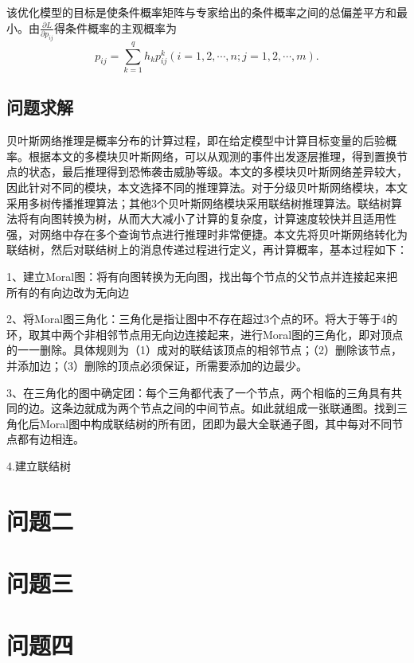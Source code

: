 \documentclass[bwprint]{gmcmthesis}
\begin{document}
该优化模型的目标是使条件概率矩阵与专家给出的条件概率之间的总偏差平方和最小。由$\frac{\partial L}{\partial p_{ij}}$得条件概率的主观概率为
\begin{equation}
	p_{ij}=\sum_{k=1}^{q}h_kp_{ij}^k(i=1,2,\cdots,n;j=1,2,\cdots,m).
\end{equation}
\subsection{问题求解}
贝叶斯网络推理是概率分布的计算过程，即在给定模型中计算目标变量的后验概率。根据本文的多模块贝叶斯网络，可以从观测的事件出发逐层推理，得到置换节点的状态，最后推理得到恐怖袭击威胁等级。本文的多模块贝叶斯网络差异较大，因此针对不同的模块，本文选择不同的推理算法。对于分级贝叶斯网络模块，本文采用多树传播推理算法；其他3个贝叶斯网络模块采用联结树推理算法。联结树算法将有向图转换为树，从而大大减小了计算的复杂度，计算速度较快并且适用性强，对网络中存在多个查询节点进行推理时非常便捷。本文先将贝叶斯网络转化为联结树，然后对联结树上的消息传递过程进行定义，再计算概率，基本过程如下：

1、建立Moral图：将有向图转换为无向图，找出每个节点的父节点并连接起来把所有的有向边改为无向边

2、将Moral图三角化：三角化是指让图中不存在超过3个点的环。将大于等于4的环，取其中两个非相邻节点用无向边连接起来，进行Moral图的三角化，即对顶点的一一删除。具体规则为（1）成对的联结该顶点的相邻节点；（2）删除该节点，并添加边；（3）删除的顶点必须保证，所需要添加的边最少。

3、在三角化的图中确定团：每个三角都代表了一个节点，两个相临的三角具有共同的边。这条边就成为两个节点之间的中间节点。如此就组成一张联通图。找到三角化后Moral图中构成联结树的所有团，团即为最大全联通子图，其中每对不同节点都有边相连。

4.建立联结树
\section{问题二}

\section{问题三}
\section{问题四}



\end{document}

